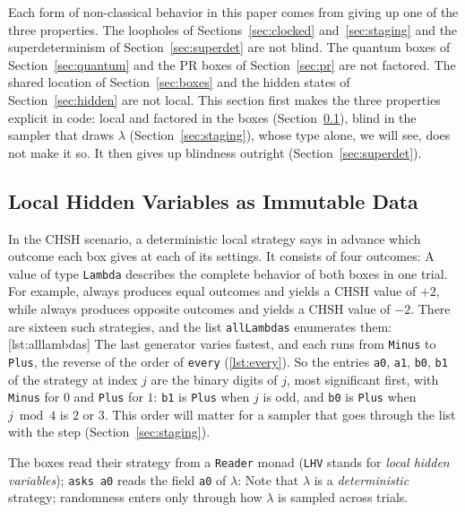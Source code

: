 \documentclass[11pt]{article}
\newcommand{\hs}{\lstinline[style=hask,basicstyle=\ttfamily,frame=none]}
\begin{document}
Each form of non-classical behavior in this paper comes from giving up one of the three properties. The loopholes of Sections~\ref{sec:clocked} and~\ref{sec:staging} and the superdeterminism of Section~\ref{sec:superdet} are not blind. The quantum boxes of Section~\ref{sec:quantum} and the PR boxes of Section~\ref{sec:pr} are not factored. The shared location of Section~\ref{sec:boxes} and the hidden states of Section~\ref{sec:hidden} are not local. This section first makes the three properties explicit in code: local and factored in the boxes (Section~\ref{sec:lhv}), blind in the sampler that draws $\lambda$ (Section~\ref{sec:staging}), whose type alone, we will see, does not make it so. It then gives up blindness outright (Section~\ref{sec:superdet}).

\subsection{Local Hidden Variables as Immutable Data}\label{sec:lhv}

In the CHSH scenario, a deterministic local strategy says in advance which outcome each box gives at each of its settings. It consists of four outcomes:
A value of type \hs|Lambda| describes the complete behavior of both boxes in one trial. For example,
\noindent always produces equal outcomes and yields a CHSH value of $+2$, while
\noindent always produces opposite outcomes and yields a CHSH value of $-2$. There are sixteen such strategies, and the list \hs|allLambdas| enumerates them:
[lst:alllambdas]
The last generator varies fastest, and each runs from \hs|Minus| to \hs|Plus|, the reverse of the order of \hs|every| (\ref{lst:every}). So the entries \hs|a0|, \hs|a1|, \hs|b0|, \hs|b1| of the strategy at index $j$ are the binary digits of $j$, most significant first, with \hs|Minus| for $0$ and \hs|Plus| for $1$: \hs|b1| is \hs|Plus| when $j$ is odd, and \hs|b0| is \hs|Plus| when $j \bmod 4$ is $2$ or $3$. This order will matter for a sampler that goes through the list with the step (Section~\ref{sec:staging}).

The boxes read their strategy from a \hs|Reader| monad (\hs|LHV| stands for \emph{local hidden variables}); \hs|asks a0| reads the field \hs|a0| of $\lambda$:
Note that $\lambda$ is a \emph{deterministic} strategy; randomness enters only through how $\lambda$ is sampled across trials.
\end{document}
